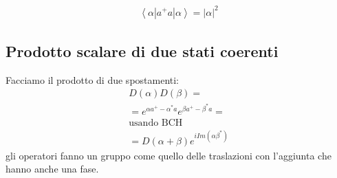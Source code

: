 \begin{equation}\begin{split}
\left\langle \alpha|a^+a|\alpha \right\rangle=|\alpha|^2
\end{split}\end{equation}

\subsection{Prodotto scalare di due stati coerenti} %
Facciamo il prodotto di due spostamenti:
\begin{equation}\begin{split}
D\left(\alpha\right)D\left(\beta\right)=\\
=e^{\alpha a^+-\alpha^*a}e^{\beta a^+-\beta^*a}=\\
\textrm{usando BCH}\\
=D\left(\alpha+\beta\right)e^{i Im{\left(\alpha\beta^*\right)}}
\end{split}\end{equation}
gli operatori fanno un gruppo come quello delle traslazioni con l'aggiunta che hanno anche una fase.

